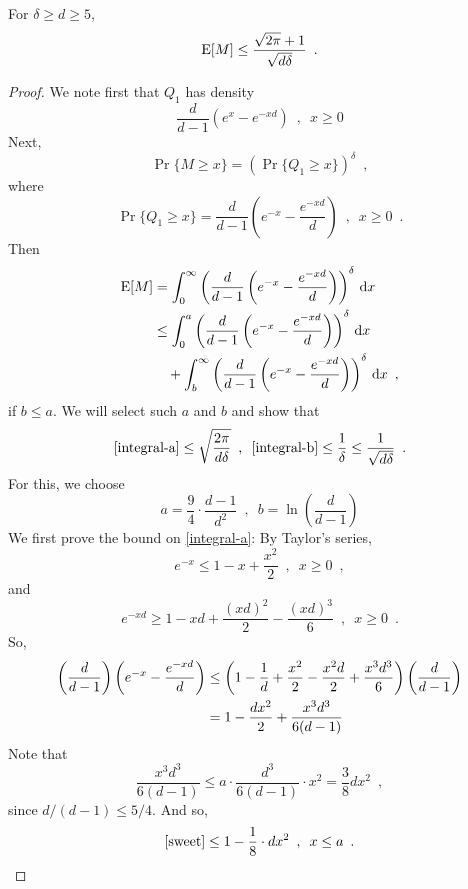 \documentclass[lotsofwhite]{patmorin}
\begin{document}
\begin{lem}
   For $\delta\ge d \ge 5$, 
   \[  \mathrm{E}[M] \le \frac{\sqrt{2\pi} + 1}{\sqrt{d\delta}} \enspace . \]
\end{lem}

\begin{proof}
   We note first that $Q_1$ has density
   \[
        \frac{d}{d-1}\left(e^x - e^{-xd}\right) \enspace , \enspace x\ge 0
   \]
   Next,
   \[
        \Pr\{M \ge x\} = \left(\Pr\{Q_1\ge x\}\right)^{\delta} \enspace ,
   \]
   where 
   \[
        \Pr\{Q_1\ge x\} = \frac{d}{d-1}\left(e^{-x}-\frac{e^{-xd}}{d}\right) \enspace ,\enspace x\ge 0 \enspace .
   \]
   Then
   \begin{align}
       \E[M] 
        & = \int_0^\infty \left(\frac{d}{d-1}\left(e^{-x}-\frac{e^{-xd}}{d}\right)\right)^\delta \,\mathrm{d}x \notag \\ 
        & \le
          \int_0^a \left(\frac{d}{d-1}\left(e^{-x}-\frac{e^{-xd}}{d}\right)\right)^\delta \,\mathrm{d}x  \eqlabel{integral-a} \\
          & \quad + \int_b^\infty \left(\frac{d}{d-1}\left(e^{-x}-\frac{e^{-xd}}{d}\right)\right)^\delta \,\mathrm{d}x \enspace , \eqlabel{integral-b}
   \end{align}
   if $b\le a$.  We will select such $a$ and $b$ and show that 
   \[  \eqref{integral-a} \le \sqrt{\frac{2\pi}{d\delta}} \enspace , \enspace
       \eqref{integral-b} \le \frac{1}{\delta} \le \frac{1}{\sqrt{d\delta}} \enspace .
   \]
   For this, we choose 
   \[
        a = \frac{9}{4}\cdot\frac{d-1}{d^2} \enspace, \enspace b=\ln\left(\frac{d}{d-1}\right)
   \]
   We first prove the bound on \eqref{integral-a}:  By Taylor's series, 
   \[   e^{-x} \le 1 - x + \frac{x^2}{2} \enspace , \enspace x\ge 0 \enspace , \]
   and
   \[   e^{-xd} \ge 1 - xd + \frac{(xd)^2}{2} - \frac{(xd)^3}{6}\enspace , \enspace x\ge 0 \enspace . \]
   So,
   \begin{align}
       \left(\frac{d}{d-1}\right)\left(e^{-x}-\frac{e^{-xd}}{d}\right)
       & \le 
       \left(
         1-\frac{1}{d}+\frac{x^2}{2}-\frac{x^2d}{2}+\frac{x^3d^3}{6}
       \right) \left(\frac{d}{d-1}\right) \notag \\
       & = 1-\frac{dx^2}{2}+\frac{x^3d^3}{6(d-1)}  \eqlabel{sweet}
   \end{align}
   Note that
   \[
         \frac{x^3d^3}{6(d-1)} \le a\cdot \frac{d^3}{6(d-1)}\cdot x^2
      = \frac{3}{8}dx^2 
      \enspace ,
   \] 
   since $d/(d-1) \le 5/4$. And so,
   \[
      \eqref{sweet} \le 1-\frac{1}{8}\cdot dx^2 \enspace , \enspace x \le a \enspace .
\]
\end{proof}
\end{document}
